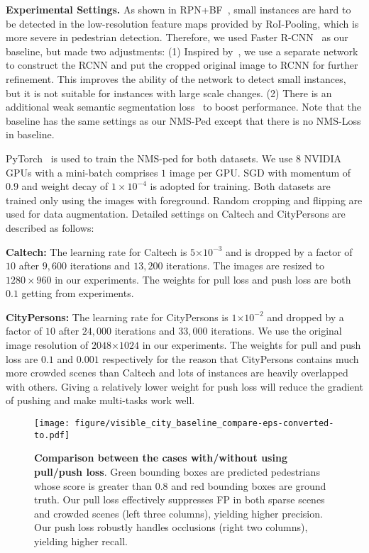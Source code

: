 \documentclass[sigconf]{acmart}
\begin{document}
\noindent
\textbf{Experimental Settings.}
As shown in RPN+BF~\cite{zhang2016faster}, small instances are hard to be detected in the low-resolution feature maps provided by RoI-Pooling, which is more severe in pedestrian detection. Therefore, we used Faster R-CNN~\cite{ren2015faster} as our baseline, but made two adjustments: (1) Inspired by~\cite{zhang2016faster}, we use a separate network to construct the RCNN and put the cropped original image to RCNN for further refinement. This improves the ability of the network to detect small instances, but it is not suitable for instances with large scale changes. (2) There is an additional weak semantic segmentation loss~\cite{brazil2017illuminating} to boost performance. Note that the baseline has the same settings as our NMS-Ped except that there is no NMS-Loss in baseline.

PyTorch~\cite{paszke2017automatic} is used to train the NMS-ped for both datasets. We use $8$ NVIDIA GPUs with a mini-batch comprises $1$ image per GPU. SGD with momentum of $0.9$ and weight decay of $1 \times 10^{-4}$ is adopted for training. Both datasets are trained only using the images with foreground. Random cropping and flipping are used for data augmentation. Detailed settings on Caltech and CityPersons are described as follows:

\textbf{Caltech:}
The learning rate for Caltech is $5$$\times$$10^{-3}$ and is dropped by a factor of $10$ after $9,600 $ iterations and $13,200$ iterations. The images are resized to $1280 \times 960$ in our experiments. The weights for pull loss and push loss are both $0.1$ getting from experiments.

\textbf{CityPersons:}
The learning rate for CityPersons is $1$$\times$$10^{-2}$ and dropped by a factor of $10$ after $24,000$ iterations and $33,000$ iterations. We use the original image resolution of $2048$$\times$$1024$ in our experiments. The weights for pull and push loss are $0.1$ and $0.001$ respectively for the reason that CityPersons contains much more crowded scenes than Caltech and lots of instances are heavily overlapped with others. Giving a relatively lower weight for push loss will reduce the gradient of pushing and make multi-tasks work well.

\begin{figure}[t]
\centering
\texttt{[image: figure/visible\_city\_baseline\_compare-eps-converted-to.pdf]}
\vspace{-2mm}
\caption{\textbf{Comparison between the cases with/without using pull/push loss}. Green bounding boxes are predicted pedestrians whose score is greater than $0.8$ and red bounding boxes are ground truth. Our pull loss effectively suppresses FP in both sparse scenes and crowded scenes (left three columns), yielding higher precision. Our push loss  robustly handles occlusions (right two columns), yielding higher recall.}
\label{visible_city_baseline_compare}
\vspace{-2mm}
\end{figure}
\end{document}
